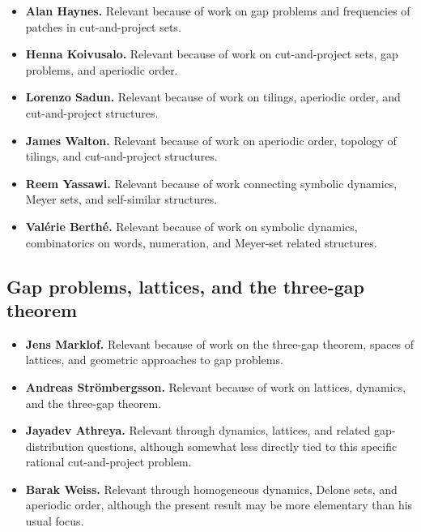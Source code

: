 \documentclass[11pt]{article}
\begin{document}
\begin{itemize}
    \item \textbf{Alan Haynes.}  Relevant because of work on gap problems and
    frequencies of patches in cut-and-project sets.

    \item \textbf{Henna Koivusalo.}  Relevant because of work on
    cut-and-project sets, gap problems, and aperiodic order.

    \item \textbf{Lorenzo Sadun.}  Relevant because of work on tilings,
    aperiodic order, and cut-and-project structures.

    \item \textbf{James Walton.}  Relevant because of work on aperiodic order,
    topology of tilings, and cut-and-project structures.

    \item \textbf{Reem Yassawi.}  Relevant because of work connecting symbolic
    dynamics, Meyer sets, and self-similar structures.

    \item \textbf{Val\'{e}rie Berth\'{e}.}  Relevant because of work on
    symbolic dynamics, combinatorics on words, numeration, and Meyer-set
    related structures.
\end{itemize}

\subsection*{Gap problems, lattices, and the three-gap theorem}

\begin{itemize}
    \item \textbf{Jens Marklof.}  Relevant because of work on the three-gap
    theorem, spaces of lattices, and geometric approaches to gap problems.

    \item \textbf{Andreas Str\"ombergsson.}  Relevant because of work on
    lattices, dynamics, and the three-gap theorem.

    \item \textbf{Jayadev Athreya.}  Relevant through dynamics, lattices, and
    related gap-distribution questions, although somewhat less directly tied
    to this specific rational cut-and-project problem.

    \item \textbf{Barak Weiss.}  Relevant through homogeneous dynamics,
    Delone sets, and aperiodic order, although the present result may be more
    elementary than his usual focus.
\end{itemize}
\end{document}
